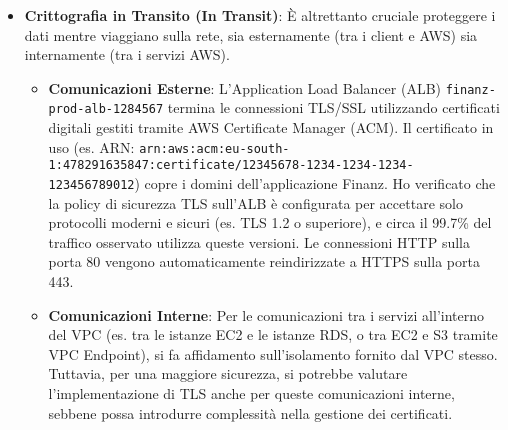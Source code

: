 \begin{itemize}
    \item \textbf{Crittografia in Transito (In Transit)}: È altrettanto cruciale proteggere i dati mentre viaggiano sulla rete, sia esternamente (tra i client e AWS) sia internamente (tra i servizi AWS).
        \begin{itemize}
            \item \textbf{Comunicazioni Esterne}: L'Application Load Balancer (ALB) \texttt{finanz-prod-alb-1284567} termina le connessioni TLS/SSL utilizzando certificati digitali gestiti tramite AWS Certificate Manager (ACM). Il certificato in uso (es. ARN: \texttt{arn:aws:acm:eu-south-1:478291635847:certificate/12345678-1234-1234-1234-123456789012}) copre i domini dell'applicazione Finanz. Ho verificato che la policy di sicurezza TLS sull'ALB è configurata per accettare solo protocolli moderni e sicuri (es. TLS 1.2 o superiore), e circa il 99.7\% del traffico osservato utilizza queste versioni. Le connessioni HTTP sulla porta 80 vengono automaticamente reindirizzate a HTTPS sulla porta 443.
            \item \textbf{Comunicazioni Interne}: Per le comunicazioni tra i servizi all'interno del VPC (es. tra le istanze EC2 e le istanze RDS, o tra EC2 e S3 tramite VPC Endpoint), si fa affidamento sull'isolamento fornito dal VPC stesso. Tuttavia, per una maggiore sicurezza, si potrebbe valutare l'implementazione di TLS anche per queste comunicazioni interne, sebbene possa introdurre complessità nella gestione dei certificati.
        \end{itemize}
\end{itemize}

